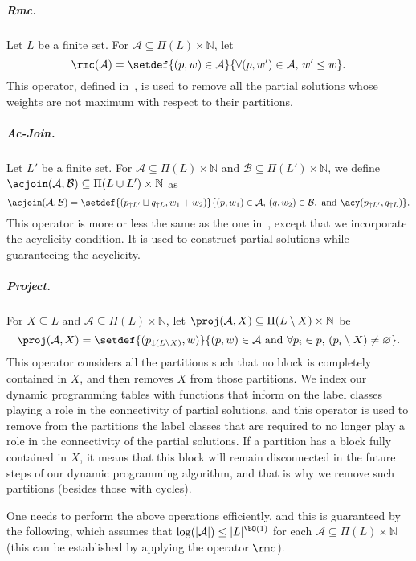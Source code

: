 \begin{toappendix}
\subparagraph{Rmc.}
Let $L$ be a finite set.
For $\mathcal{A} \subseteq \Pi(L) \times \mathbb{N}$, let
\[
    \rmc(\mathcal{A}) =
        \setdef{(p,w) \in \mathcal{A}}{\forall(p,w') \in \mathcal{A}, \, w' \leq w}.
\]
This operator, defined in~\cite{iandc/BodlaenderCKN15},
is used to remove all the partial solutions whose weights are not maximum with respect to their partitions.


\subparagraph{Ac-Join.}
Let $L'$ be a finite set.
For $\mathcal{A} \subseteq \Pi(L) \times \mathbb{N}$ and $\mathcal{B} \subseteq \Pi(L') \times \mathbb{N}$,
we define $\acjoin(\mathcal{A},\mathcal{B}) \subseteq \Pi(L \cup L') \times \mathbb{N}$ as
\[
    \acjoin(\mathcal{A},\mathcal{B}) =
        \setdef{(p_{\uparrow L'}\sqcup q_{\uparrow L},w_1+w_2)}
            {(p,w_1) \in \mathcal{A}, \, (q,w_2) \in \mathcal{B}, \textrm{ and }
            \acy(p_{\uparrow L'},q_{\uparrow L})}.
\]%
This operator is more or less the same as the one in~\cite{iandc/BodlaenderCKN15},
except that we incorporate the acyclicity condition.
It is used to construct partial solutions while guaranteeing the acyclicity.

\subparagraph{Project.}
For $X \subseteq L$ and $\mathcal{A} \subseteq \Pi(L) \times \mathbb{N}$,
let $\proj(\mathcal{A},X) \subseteq \Pi(L \setminus X) \times \mathbb{N}$ be
\[
    \proj(\mathcal{A},X) = \setdef{(p_{\downarrow (L \setminus X)},w)}
        {(p,w) \in \mathcal{A} \textrm{ and } \forall p_i \in p, \, (p_i \setminus X) \neq \varnothing}.
\]
This operator considers all the partitions such that no block is completely contained in $X$,
and then removes $X$ from those partitions.
We index our dynamic programming tables with functions that inform on the label classes playing
a role in the connectivity of partial solutions, and this operator is used to remove from the
partitions the label classes that are required to no longer play a role in the connectivity of
the partial solutions.
If a partition has a block fully contained in $X$, it means that this block will remain
disconnected in the future steps of our dynamic programming algorithm, and that is why
we remove such partitions (besides those with cycles).

\bigskip

One needs to perform the above operations efficiently, and this is guaranteed by the following,
which assumes that $\log(|\mathcal{A}|) \le |L|^{\bO(1)}$ for each
$\mathcal{A} \subseteq \Pi(L) \times \mathbb{N}$ (this can be established by applying the operator $\rmc$).


\end{toappendix}
